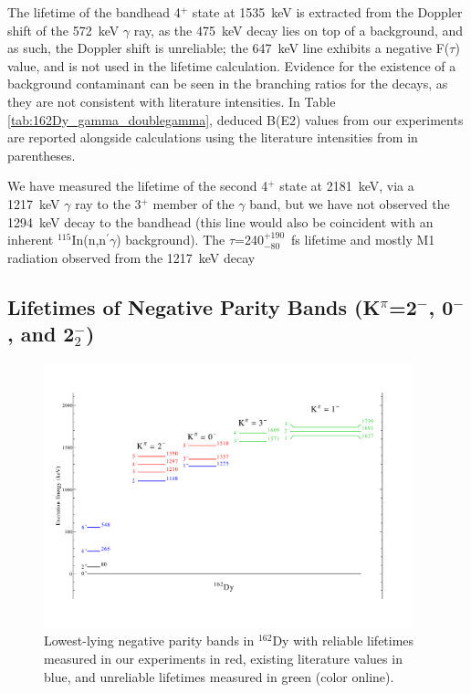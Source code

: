 The lifetime of the bandhead 4$^+$ state at 1535~keV is extracted from the Doppler shift of the 572~keV $\gamma$ ray, as the 475~keV decay lies on top of a background, and as such, the Doppler shift is unreliable; the 647~keV line exhibits a negative F($\tau$) value, and is not used in the lifetime calculation. Evidence for the existence of a background contaminant can be seen in the branching ratios for the decays, as they are not consistent with literature intensities. In Table \ref{tab:162Dy_gamma_doublegamma}, deduced B(E2) values from our experiments are reported alongside calculations using the literature intensities from \cite{Aprahamian200642} in parentheses.

We have measured the lifetime of the second 4$^+$ state at 2181~keV, via a 1217~keV $\gamma$ ray to the 3$^+$ member of the $\gamma$ band, but we have not observed the 1294~keV decay to the bandhead (this line would also be coincident with an inherent $^{115}$In(n,n$^\prime\gamma$) background). The $\tau$=240$^{+190}_{-80}$~fs lifetime and mostly M1 radiation observed from the 1217~keV decay
\subsection{Lifetimes of Negative Parity Bands (K$^\pi$=2$^-$, 0$^-$, and 2$^-_2$)}


\begin{figure}[h!] 
\begin{center}
\includegraphics[width=0.95\textwidth]{figures/162Dy_LLoct.pdf}
\caption{Lowest-lying negative parity bands in $^{162}$Dy with reliable lifetimes measured in our experiments in red, existing literature values in blue, and unreliable lifetimes measured in green (color online). \label{fig:162Dy_LLoct}}
\end{center}
\end{figure}

